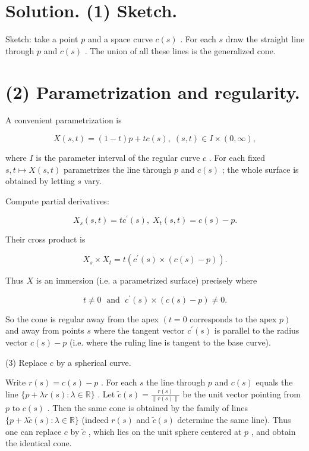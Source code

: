 \documentclass[10pt]{article}
\begin{document}
\section*{Solution. (1) Sketch.}

Sketch: take a point \(p\) and a space curve \(c\left( s\right)\) . For each \(s\) draw the straight line through \(p\) and \(c\left( s\right)\) . The union of all these lines is the generalized cone.

\section*{(2) Parametrization and regularity.}

A convenient parametrization is

\[
X\left( {s,t}\right)  = \left( {1 - t}\right) p + {tc}\left( s\right) ,\;\left( {s,t}\right)  \in  I \times  \left( {0,\infty }\right) ,
\]

where \(I\) is the parameter interval of the regular curve \(c\) . For each fixed \(s,t \mapsto  X\left( {s,t}\right)\) parametrizes the line through \(p\) and \(c\left( s\right)\) ; the whole surface is obtained by letting \(s\) vary.

Compute partial derivatives:

\[
{X}_{s}\left( {s,t}\right)  = t{c}^{\prime }\left( s\right) ,\;{X}_{t}\left( {s,t}\right)  = c\left( s\right)  - p.
\]

Their cross product is

\[
{X}_{s} \times  {X}_{t} = t\left( {{c}^{\prime }\left( s\right)  \times  \left( {c\left( s\right)  - p}\right) }\right) .
\]

Thus \(X\) is an immersion (i.e. a parametrized surface) precisely where

\[
t \neq  0\;\text{ and }\;{c}^{\prime }\left( s\right)  \times  \left( {c\left( s\right)  - p}\right)  \neq  0.
\]

So the cone is regular away from the apex \(\left( {t = 0\text{ corresponds to the apex }p}\right)\) and away from points \(s\) where the tangent vector \({c}^{\prime }\left( s\right)\) is parallel to the radius vector \(c\left( s\right)  - p\) (i.e. where the ruling line is tangent to the base curve).

(3) Replace \(c\) by a spherical curve.

Write \(r\left( s\right)  = c\left( s\right)  - p\) . For each \(s\) the line through \(p\) and \(c\left( s\right)\) equals the line \(\{ p + {\lambda r}\left( s\right)  : \lambda  \in  \mathbb{R}\}\) . Let \(\widetilde{c}\left( s\right)  = \frac{r\left( s\right) }{\parallel r\left( s\right) \parallel }\) be the unit vector pointing from \(p\) to \(c\left( s\right)\) . Then the same cone is obtained by the family of lines \(\{ p + \lambda \widetilde{c}\left( s\right)  : \lambda  \in  \mathbb{R}\}\) (indeed \(r\left( s\right)\) and \(\widetilde{c}\left( s\right)\) determine the same line). Thus one can replace \(c\) by \(\widetilde{c}\) , which lies on the unit sphere centered at \(p\) , and obtain the identical cone.
\end{document}
